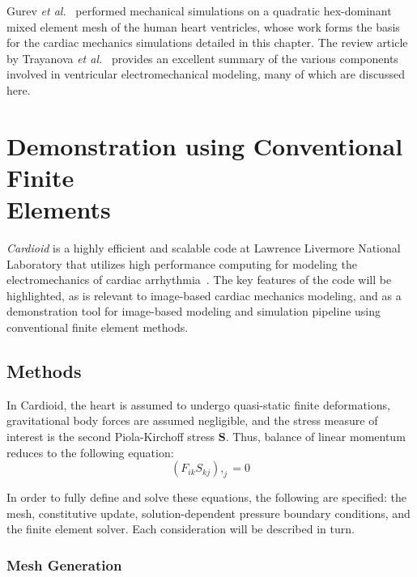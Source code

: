 Gurev \textit{et al.}~\cite{gurev_2015} performed mechanical simulations on a quadratic hex-dominant mixed element mesh of the human heart ventricles, whose work forms the basis for the cardiac mechanics simulations detailed in this chapter. The review article by Trayanova \textit{et al.}~\cite{trayanova_2011} provides an excellent summary of the various components involved in ventricular electromechanical modeling, many of which are discussed here.

\section[Demonstration using Conventional Finite Elements]{Demonstration using Conventional Finite \\ Elements}

\textit{Cardioid} is a highly efficient and scalable code at Lawrence Livermore National Laboratory that utilizes high performance computing for modeling the electromechanics of cardiac arrhythmia~\cite{richards_2013, gurev_2015}. The key features of the code will be highlighted, as is relevant to image-based cardiac mechanics modeling, and as a demonstration tool for image-based modeling and simulation pipeline using conventional finite element methods.

\subsection{Methods}
\label{Methods}

In Cardioid, the heart is assumed to undergo quasi-static finite deformations, gravitational body forces are assumed negligible, and the stress measure of interest is the second Piola-Kirchoff stress $\bm{S}$. Thus, balance of linear momentum reduces to the following equation:
\begin{equation}
(F_{ik}S_{kj}),_{j} = 0
\end{equation}

In order to fully define and solve these equations, the following are specified: the mesh, constitutive update, solution-dependent pressure boundary conditions, and the finite element solver. Each consideration will be described in turn.

\subsubsection{Mesh Generation}
\label{Mesh Generation}

